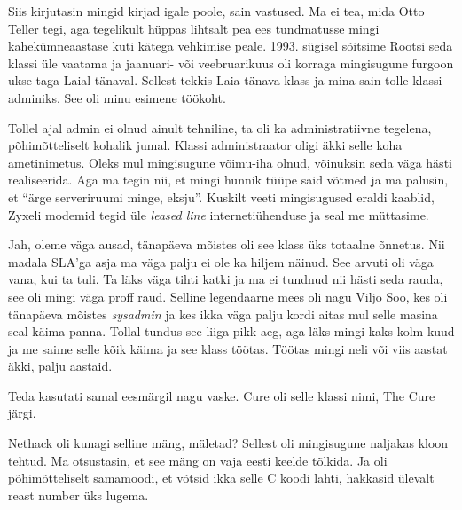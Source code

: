 Siis kirjutasin mingid kirjad igale poole, sain vastused. Ma ei tea, mida Otto 
Teller tegi, aga tegelikult hüppas lihtsalt pea ees tundmatusse mingi kahekümneaastase 
kuti kätega vehkimise peale. 1993. sügisel sõitsime Rootsi seda klassi 
üle vaatama ja  jaanuari- või veebruarikuus oli korraga mingisugune furgoon 
ukse taga Laial tänaval. Sellest tekkis Laia tänava klass ja mina sain tolle klassi adminiks. See oli minu 
esimene töökoht.

Tollel ajal admin ei olnud ainult  tehniline,  ta oli ka  
administratiivne tegelena, põhimõtteliselt kohalik jumal. Klassi administraator 
oligi äkki selle koha ametinimetus. Oleks mul mingisugune võimu-iha olnud, 
võinuksin seda väga hästi realiseerida. Aga ma tegin nii, et mingi hunnik tüüpe 
said võtmed ja ma palusin, et \enquote{ärge serveriruumi minge, eksju}. Kuskilt 
veeti mingisugused eraldi kaablid, Zyxeli modemid tegid üle \emph{leased line} 
internetiühenduse  ja seal me müttasime.

Jah, oleme väga ausad, tänapäeva mõistes oli see klass üks totaalne õnnetus. Nii 
madala SLA'ga asja ma  väga palju ei ole ka hiljem näinud. See arvuti oli väga 
vana, kui ta tuli. Ta läks väga tihti katki ja ma ei tundnud nii hästi seda 
rauda, see oli mingi väga proff raud. Selline legendaarne mees oli nagu Viljo 
Soo, kes oli tänapäeva mõistes \emph{sysadmin} ja kes 
ikka  väga palju kordi aitas mul selle masina seal käima panna. Tollal tundus 
see liiga pikk aeg,  aga läks mingi kaks-kolm kuud ja me 
saime selle kõik käima ja see klass töötas. Töötas mingi neli või 
viis aastat äkki, palju aastaid. 

Teda kasutati  samal eesmärgil nagu vaske. Cure 
oli selle klassi nimi, The Cure järgi. 

Nethack oli kunagi selline mäng, mäletad? Sellest oli 
mingisugune naljakas kloon tehtud. Ma otsustasin, et see mäng on vaja eesti keelde 
tõlkida. Ja oli põhimõtteliselt samamoodi, et võtsid ikka selle C koodi lahti, 
hakkasid ülevalt reast number üks lugema.


